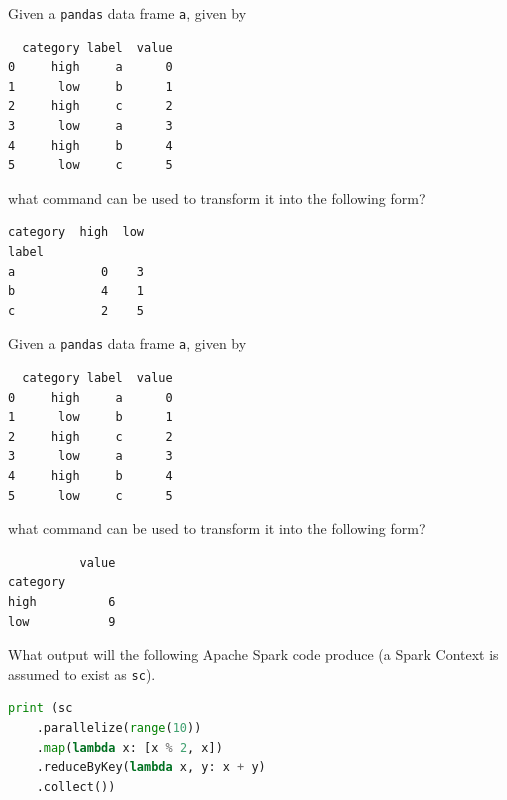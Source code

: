 \documentclass[a4paper,11pt,english,plainsub]{uioexam}
\begin{document}


Given a {\tt pandas} data frame {\tt a}, given by

\begin{verbatim}
  category label  value
0     high     a      0
1      low     b      1
2     high     c      2
3      low     a      3
4     high     b      4
5      low     c      5
\end{verbatim}

what command can be used to transform it into the following form?

\begin{verbatim}
category  high  low
label
a            0    3
b            4    1
c            2    5
\end{verbatim}

\begin{choicelist}[]
\end{choicelist}


Given a {\tt pandas} data frame {\tt a}, given by

\begin{verbatim}
  category label  value
0     high     a      0
1      low     b      1
2     high     c      2
3      low     a      3
4     high     b      4
5      low     c      5
\end{verbatim}

what command can be used to transform it into the following form?

\begin{verbatim}
          value
category
high          6
low           9
\end{verbatim}

\begin{choicelist}[]
\end{choicelist}



What output will the following Apache Spark code produce (a Spark
Context is assumed to exist as {\tt sc}).

\begin{lstlisting}[language=Python]
  print (sc
    .parallelize(range(10))
    .map(lambda x: [x % 2, x])
    .reduceByKey(lambda x, y: x + y)
    .collect())
\end{lstlisting}
\end{document}
